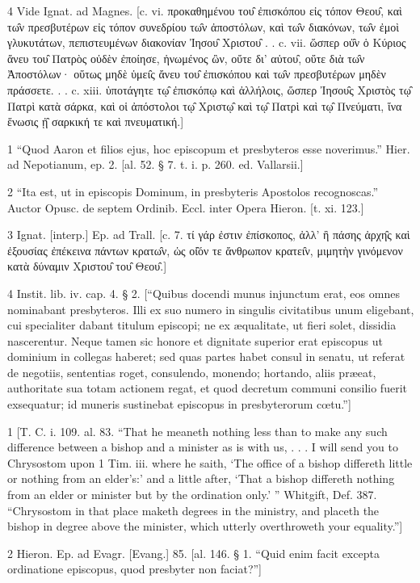 4
Vide Ignat. ad Magnes. [c. vi. προκαθημένου του̑ ἐπισκόπου εἰς τόπον Θεου̑, καὶ τω̑ν πρεσβυτέρων εἰς τόπον συνεδρίου τω̑ν ἀποστόλων, καὶ τω̑ν διακόνων, τω̑ν ἐμοὶ γλυκυτάτων, πεπιστευμένων διακονίαν Ἰησου̑ Χριστου̑ . . c. vii. ὥσπερ οὐ̑ν ὁ Κύριος ἄνευ του̑ Πατρὸς οὐδὲν ἐποίησε, ἡνωμένος ὢν, οὔτε δι’ αὐτου̑, οὔτε διὰ τω̑ν Ἀποστόλων· οὕτως μηδὲ ὑμει̑ς ἄνευ του̑ ἐπισκόπου καὶ τω̑ν πρεσβυτέρων μηδὲν πράσσετε. . . c. xiii. ὑποτάγητε τῳ̑ ἐπισκόπῳ καὶ ἀλλήλοις, ὥσπερ Ἰησου̑ς Χριστὸς τῳ̑ Πατρὶ κατὰ σάρκα, καὶ οἱ ἀπόστολοι τῳ̑ Χριστῳ̑ καὶ τῳ̑ Πατρὶ καὶ τῳ̑ Πνεύματι, ἵνα ἕνωσις ᾐ̑ σαρκική τε καὶ πνευματική.]

1
“Quod Aaron et filios ejus, hoc episcopum et presbyteros esse noverimus.” Hier. ad Nepotianum, ep. 2. [al. 52. § 7. t. i. p. 260. ed. Vallarsii.]

2
“Ita est, ut in episcopis Dominum, in presbyteris Apostolos recognoscas.” Auctor Opusc. de septem Ordinib. Eccl. inter Opera Hieron. [t. xi. 123.]

3
Ignat. [interp.] Ep. ad Trall. [c. 7. τί γάρ ἐστιν ἐπίσκοπος, ἀλλ’ ἢ πάσης ἀρχη̑ς καὶ ἐξουσίας ἐπέκεινα πάντων κρατω̑ν, ὡς οἱ̑όν τε ἄνθρωπον κρατει̑ν, μιμητὴν γινόμενον κατὰ δύναμιν Χριστου̑ του̑ Θεου̑.]

4
Instit. lib. iv. cap. 4. § 2. [“Quibus docendi munus injunctum erat, eos omnes nominabant presbyteros. Illi ex suo numero in singulis civitatibus unum eligebant, cui specialiter dabant titulum episcopi; ne ex æqualitate, ut fieri solet, dissidia nascerentur. Neque tamen sic honore et dignitate superior erat episcopus ut dominium in collegas haberet; sed quas partes habet consul in senatu, ut referat de negotiis, sententias roget, consulendo, monendo; hortando, aliis præeat, authoritate sua totam actionem regat, et quod decretum communi consilio fuerit exsequatur; id muneris sustinebat episcopus in presbyterorum cœtu.”]

1
[T. C. i. 109. al. 83. “That he meaneth nothing less than to make any such difference between a bishop and a minister as is with us, . . . I will send you to Chrysostom upon 1 Tim. iii. where he saith, ‘The office of a bishop differeth little or nothing from an elder’s:’ and a little after, ‘That a bishop differeth nothing from an elder or minister but by the ordination only.’ ” Whitgift, Def. 387. “Chrysostom in that place maketh degrees in the ministry, and placeth the bishop in degree above the minister, which utterly overthroweth your equality.”]

2
Hieron. Ep. ad Evagr. [Evang.] 85. [al. 146. § 1. “Quid enim facit excepta ordinatione episcopus, quod presbyter non faciat?”]

